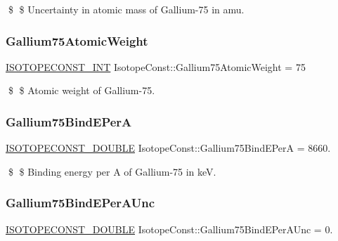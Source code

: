 \$ \$ Uncertainty in atomic mass of Gallium-\/75 in amu. \mbox{\label{group___isotope_const-_gallium-_ga75_ga8fbbbfd7bffcab084ac2a5830ea9d9bb}} 
\subsubsection{\texorpdfstring{Gallium75\+Atomic\+Weight}{Gallium75AtomicWeight}}
{\footnotesize\ttfamily \mbox{\hyperlink{group___isotope_const-_macros_ga5f18360b3e99483a35c32d789e62621c}{I\+S\+O\+T\+O\+P\+E\+C\+O\+N\+S\+T\+\_\+\+I\+NT}} Isotope\+Const\+::\+Gallium75\+Atomic\+Weight = 75}

\$ \$ Atomic weight of Gallium-\/75. \mbox{\label{group___isotope_const-_gallium-_ga75_ga68702ae4e4d1495a8bb77059797e389e}} 
\subsubsection{\texorpdfstring{Gallium75\+Bind\+E\+PerA}{Gallium75BindEPerA}}
{\footnotesize\ttfamily \mbox{\hyperlink{group___isotope_const-_macros_ga8f45a7272ce02c0b4c65c44636ed719a}{I\+S\+O\+T\+O\+P\+E\+C\+O\+N\+S\+T\+\_\+\+D\+O\+U\+B\+LE}} Isotope\+Const\+::\+Gallium75\+Bind\+E\+PerA = 8660.}

\$ \$ Binding energy per A of Gallium-\/75 in keV. \mbox{\label{group___isotope_const-_gallium-_ga75_gaba9e2b9a8a7ae02be951f636c3b300d9}} 
\subsubsection{\texorpdfstring{Gallium75\+Bind\+E\+Per\+A\+Unc}{Gallium75BindEPerAUnc}}
{\footnotesize\ttfamily \mbox{\hyperlink{group___isotope_const-_macros_ga8f45a7272ce02c0b4c65c44636ed719a}{I\+S\+O\+T\+O\+P\+E\+C\+O\+N\+S\+T\+\_\+\+D\+O\+U\+B\+LE}} Isotope\+Const\+::\+Gallium75\+Bind\+E\+Per\+A\+Unc = 0.}

